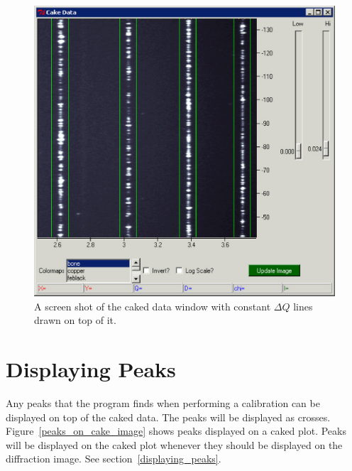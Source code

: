 \begin{figure}
    \centering
    \includegraphics[scale=.75]{figures/constant_dq_lines_on_cake_image.eps}
    \caption{A screen shot of the caked data window
    with constant $\Delta Q$ lines drawn on top of it.}
    \label{constant_dq_lines_on_cake_image}
\end{figure}


\section{Displaying Peaks}

Any peaks that the program finds when performing
a calibration can be displayed on top of the caked
data. The peaks will be displayed as crosses.
Figure~\ref{peaks_on_cake_image} shows peaks
displayed on a caked plot. Peaks will be displayed on 
the caked plot whenever they should be displayed on 
the diffraction image. See section~\ref{displaying_peaks}.


